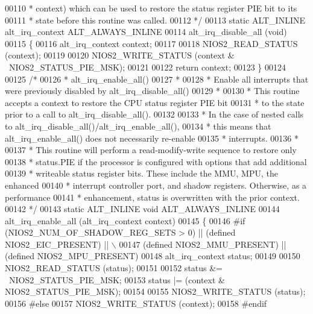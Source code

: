\begin{DoxyCode}
00110 \textcolor{comment}{ * context) which can be used to restore the status register PIE bit to its }
00111 \textcolor{comment}{ * state before this routine was called.}
00112 \textcolor{comment}{ */}
00113 \textcolor{keyword}{static} ALT_INLINE alt\_irq\_context ALT_ALWAYS_INLINE 
00114        alt_irq_disable_all (\textcolor{keywordtype}{void})
00115 \{
00116   alt\_irq\_context context;
00117 
00118   NIOS2_READ_STATUS (context);
00119 
00120   NIOS2_WRITE_STATUS (context & ~NIOS2_STATUS_PIE_MSK);
00121   
00122   \textcolor{keywordflow}{return} context;
00123 \}
00124 
00125 \textcolor{comment}{/*}
00126 \textcolor{comment}{ * alt\_irq\_enable\_all() }
00127 \textcolor{comment}{ *}
00128 \textcolor{comment}{ * Enable all interrupts that were previously disabled by alt\_irq\_disable\_all()}
00129 \textcolor{comment}{ *}
00130 \textcolor{comment}{ * This routine accepts a context to restore the CPU status register PIE bit}
00131 \textcolor{comment}{ * to the state prior to a call to alt\_irq\_disable\_all().}
00132 \textcolor{comment}{ }
00133 \textcolor{comment}{ * In the case of nested calls to alt\_irq\_disable\_all()/alt\_irq\_enable\_all(), }
00134 \textcolor{comment}{ * this means that alt\_irq\_enable\_all() does not necessarily re-enable}
00135 \textcolor{comment}{ * interrupts.}
00136 \textcolor{comment}{ *}
00137 \textcolor{comment}{ * This routine will perform a read-modify-write sequence to restore only}
00138 \textcolor{comment}{ * status.PIE if the processor is configured with options that add additional }
00139 \textcolor{comment}{ * writeable status register bits. These include the MMU, MPU, the enhanced }
00140 \textcolor{comment}{ * interrupt controller port, and shadow registers. Otherwise, as a performance}
00141 \textcolor{comment}{ * enhancement, status is overwritten with the prior context. }
00142 \textcolor{comment}{ */}
00143 \textcolor{keyword}{static} ALT_INLINE \textcolor{keywordtype}{void} ALT_ALWAYS_INLINE 
00144        alt_irq_enable_all (alt\_irq\_context context)
00145 \{
00146 \textcolor{preprocessor}{#if (NIOS2\_NUM\_OF\_SHADOW\_REG\_SETS > 0) || (defined NIOS2\_EIC\_PRESENT) || \(\backslash\)}
00147 \textcolor{preprocessor}{    (defined NIOS2\_MMU\_PRESENT) || (defined NIOS2\_MPU\_PRESENT)}
00148   alt\_irq\_context status;
00149   
00150   NIOS2_READ_STATUS (status);
00151   
00152   status &= ~NIOS2_STATUS_PIE_MSK;
00153   status |= (context & NIOS2_STATUS_PIE_MSK);
00154   
00155   NIOS2_WRITE_STATUS (status);
00156 \textcolor{preprocessor}{#else}
00157   NIOS2_WRITE_STATUS (context);
00158 \textcolor{preprocessor}{#endif}

\end{DoxyCode}
